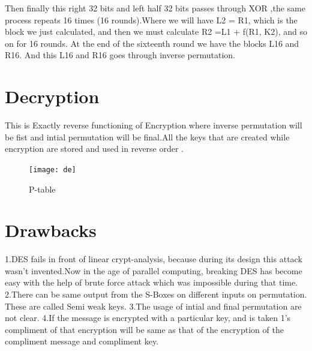 \documentclass[11pt]{article}
\begin{document}
Then finally this right 32 bits and left half 32 bits passes through XOR ,the same process repeats 16 times (16 rounds).Where we will have L2 = R1, which is the block we just calculated, and then we must calculate R2 =L1 + f(R1, K2), and so on for 16 rounds. At the end of the sixteenth round we have the blocks L16 and R16. And this L16 and R16 goes through inverse permutation.
\section{Decryption}
This is Exactly reverse functioning of Encryption where inverse permutation will be fist and intial permutation will be final.All the keys that are created while encryption are  stored and used in reverse order .
\begin{figure}[!h]
	\begin{center}
		\texttt{[image: de]}
	\end{center}
	\caption{P-table}\label{nice_figure11}
\end{figure}
\section{Drawbacks}
1.DES fails in front of linear crypt-analysis, because during its design this   attack wasn't invented.Now in the age of parallel computing, breaking DES has become easy   with the help of brute force attack which was impossible during that time.\newline
2.There can be same output from the S-Boxes on different inputs on permutation. These are called Semi weak  keys.\newline
3.The usage of intial and final permutation are not clear.\newline
4.If the message is encrypted with a  particular key, and is taken 1’s compliment of that encryption will be same as that of the encryption of the compliment message and compliment key.

\end{document}
